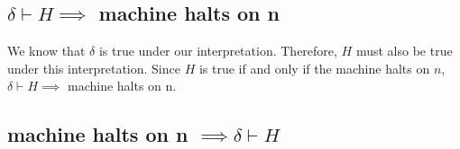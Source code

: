 \subsection{$\delta \vdash H \implies$ machine halts on n}

We know that $\delta$ is true under our interpretation.  Therefore, $H$ must also be true under this interpretation.
Since $H$ is true if and only if the machine halts on $n$, $\delta \vdash H \implies$ machine halts on n.

\subsection{machine halts on n $\implies \delta \vdash H$}

